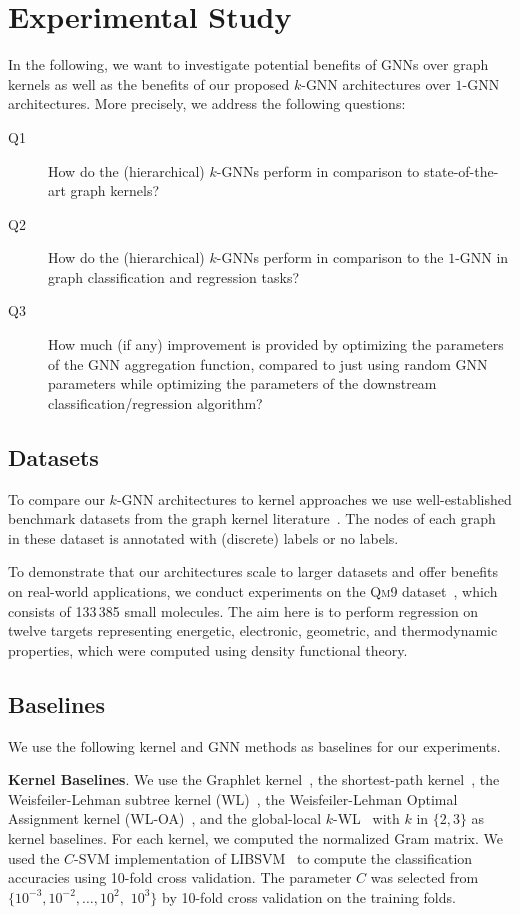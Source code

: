 \documentclass[letterpaper]{article}
\theoremstyle{definition}
\newcommand{\xhdr}[1]{{\noindent\bfseries #1}.}
\begin{document}
\section{Experimental Study}

In the following, we want to investigate potential benefits of GNNs over graph kernels as well as the benefits of our proposed $k$-GNN architectures over $1$-GNN architectures. More precisely, we address the following questions:
\begin{description}
	\item[Q1] How do the (hierarchical) $k$-GNNs perform in comparison to state-of-the-art graph kernels? 
	\item[Q2] How do the (hierarchical)  $k$-GNNs perform in comparison to the $1$-GNN in graph classification and regression tasks?
	\item[Q3]
	How much (if any) improvement is provided by optimizing the parameters of the GNN aggregation function, compared to just using random GNN parameters while optimizing the parameters of the downstream classification/regression algorithm?
\end{description}

\subsection{Datasets }
To compare our $k$-GNN architectures to kernel approaches we use well-established benchmark datasets from the graph kernel literature~\cite{KKMMN2016}. The nodes of each graph in these dataset is annotated with (discrete) labels or no labels. 

To demonstrate that our architectures scale to larger datasets and offer benefits on real-world applications, we conduct experiments on the \textsc{Qm9} dataset~\cite{Ram+2014,Rud+2012,Wu+2018}, which consists of 133\,385 small molecules. The aim here is to perform regression on twelve targets representing energetic, electronic, geometric, and thermodynamic properties, which were computed using density functional theory.


\subsection{Baselines}

We use the following kernel and GNN methods as baselines for our experiments.

\xhdr{Kernel Baselines} We use the Graphlet kernel~\cite{She+2009}, the shortest-path kernel~\cite{Borgwardt2005}, the Weisfeiler-Lehman subtree kernel (\textsc{WL})~\cite{She+2011}, the Weisfeiler-Lehman Optimal Assignment kernel (\textsc{WL-OA})~\cite{Kri+2016}, and the global-local $k$-WL~\cite{Mor+2017} with $k$ in $\{2,3\}$ as kernel baselines. 
For each kernel, we computed the normalized Gram matrix. 
We used the $C$-SVM implementation of LIBSVM~\cite{Cha+2011} to compute the classification accuracies using 10-fold cross validation. 
The parameter $C$ was selected from $\{10^{-3}, 10^{-2}, \dotsc, 10^{2},$ $10^{3}\}$ by 10-fold cross validation on the training folds. 
\end{document}
